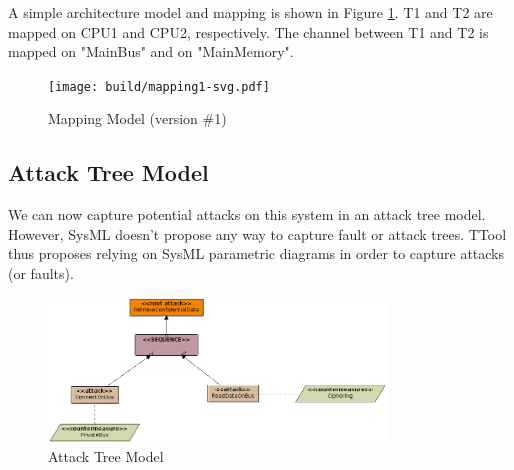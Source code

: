 \documentclass[12pt]{article}
\begin{document}
A simple architecture model and mapping is shown in Figure \ref{fig:mapping1}. T1 and T2 are mapped on CPU1 and CPU2, respectively. The channel between T1 and T2 is mapped on "MainBus" and on "MainMemory".

\begin{figure}[htbp]
\centering
\texttt{[image: build/mapping1-svg.pdf]}
\caption{Mapping Model (version \#1)} \label{fig:mapping1}
\end{figure}

\subsection{Attack Tree Model}
We can now capture potential attacks on this system in an attack tree model. However, SysML doesn't propose any way to capture fault or attack trees. TTool thus proposes relying on SysML parametric diagrams in order to capture attacks (or faults).

\begin{figure}[htbp]
\centering
\includegraphics[width=0.8\textwidth]{fig/attacktree.png}
\caption{Attack Tree Model} \label{fig:attacktree}
\end{figure}
\end{document}
